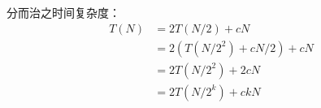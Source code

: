 \documentclass{article}
\begin{document}
分而治之时间复杂度：
\[
\begin{aligned}
	T(N) &= 2T(N/2) + cN \\
		 &= 2(T(N/2^2) + cN/2) + cN \\
		 &= 2T(N/2^2) + 2cN \\
		 &= 2T(N/2^k) + ckN
\end{aligned}
\]
\end{document}
